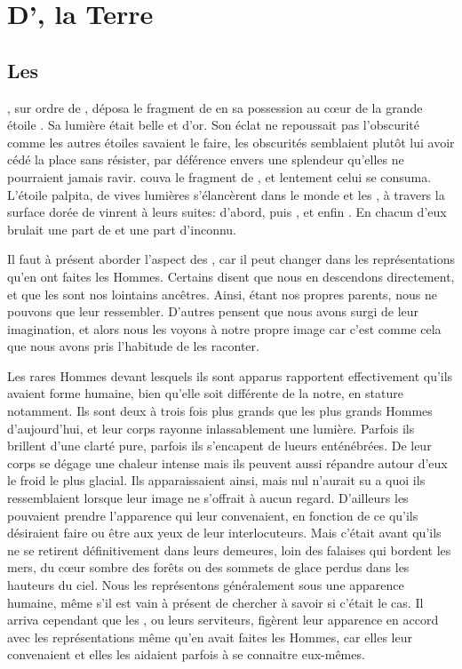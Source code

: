 \chapter{D'\Orba, la Terre}

\section{Les \Ea}

\Carac, sur ordre de \Cind, déposa le fragment de \Drisst en sa possession au cœur de la grande étoile \Naos. Sa lumière était belle et d'or. Son éclat ne repoussait pas l'obscurité comme les autres étoiles savaient le faire, les obscurités semblaient plutôt lui avoir cédé la place sans résister, par déférence envers une splendeur qu'elles ne pourraient jamais ravir. \Naos couva le fragment de \Drisst, et lentement celui se consuma. L'étoile palpita, de vives lumières s'élancèrent dans le monde et les \Ea, à travers la surface dorée de \Naos vinrent à leurs suites: \Oros d'abord, puis \Fercor, et enfin \Nio. En chacun d'eux brulait une part de \Mey et une part d'inconnu.

Il faut à présent aborder l'aspect des \Ea, car il peut changer dans les représentations qu'en ont faites les Hommes. Certains disent que nous en descendons directement, et que les \Ea sont nos lointains ancêtres. Ainsi, étant nos propres parents, nous ne pouvons que leur ressembler. D'autres pensent que nous avons surgi de leur imagination, et alors nous les voyons à notre propre image car c'est comme cela que nous avons pris l'habitude de les raconter.

Les rares Hommes devant lesquels ils sont apparus rapportent effectivement qu'ils avaient forme humaine, bien qu'elle soit différente de la notre, en stature notamment. Ils sont deux à trois fois plus grands que les plus grands Hommes d'aujourd'hui, et leur corps rayonne inlassablement une lumière. Parfois ils brillent d'une clarté pure, parfois ils s'encapent de lueurs enténébrées. De leur corps se dégage une chaleur intense mais ils peuvent aussi répandre autour d'eux le froid le plus glacial. Ils apparaissaient ainsi, mais nul n’aurait su a quoi ils ressemblaient lorsque leur image ne s’offrait à aucun regard. D'ailleurs les \Ea pouvaient prendre l'apparence qui leur convenaient, en fonction de ce qu’ils désiraient faire ou être aux yeux de leur interlocuteurs. Mais c'était avant qu'ils ne se retirent définitivement dans leurs demeures, loin des falaises qui bordent les mers, du cœur sombre des forêts ou des sommets de glace perdus dans les hauteurs du ciel. Nous les représentons généralement sous une apparence humaine, même s'il est vain à présent de chercher à savoir si c'était le cas. Il arriva cependant que les \Ea, ou leurs serviteurs, figèrent leur apparence en accord avec les représentations même qu'en avait faites les Hommes, car elles leur convenaient et elles les aidaient parfois à se connaitre eux-mêmes.

